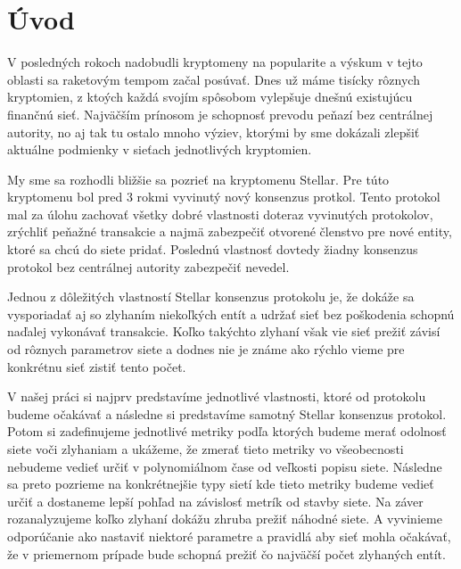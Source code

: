 \chapter*{Úvod} %

V posledných rokoch nadobudli kryptomeny na popularite a výskum v tejto
oblasti sa raketovým tempom začal posúvať. Dnes už máme tisícky rôznych
kryptomien, z ktoých každá svojím spôsobom vylepšuje dnešnú existujúcu
finančnú sieť. Najväčším prínosom je schopnosť prevodu peňazí bez
centrálnej autority, no aj tak tu ostalo mnoho výziev, ktorými by sme
dokázali zlepšiť aktuálne podmienky v sieťach jednotlivých kryptomien.

My sme sa rozhodli bližšie sa pozrieť na kryptomenu Stellar. Pre túto
kryptomenu bol pred 3 rokmi vyvinutý nový konsenzus protkol. Tento
protokol mal za úlohu zachovať všetky dobré vlastnosti doteraz vyvinutých
protokolov, zrýchliť peňažné transakcie a najmä zabezpečiť otvorené
členstvo pre nové entity, ktoré sa chcú do siete pridať. Poslednú vlastnosť
dovtedy žiadny konsenzus protokol bez centrálnej autority zabezpečiť nevedel.

Jednou z dôležitých vlastností Stellar konsenzus protokolu je, že dokáže sa
vysporiadať aj so zlyhaním niekoľkých entít a udržať sieť bez poškodenia
schopnú naďalej vykonávať transakcie.
Koľko takýchto zlyhaní však vie sieť prežiť závisí od rôznych parametrov siete
a dodnes nie je známe ako rýchlo vieme pre konkrétnu sieť zistiť tento počet.

V našej práci si najprv predstavíme jednotlivé vlastnosti, ktoré od protokolu
budeme očakávať a následne si predstavíme samotný Stellar konsenzus protokol.
Potom si zadefinujeme jednotlivé metriky podľa ktorých budeme merať odolnosť
siete voči zlyhaniam a ukážeme, že zmerať tieto metriky vo všeobecnosti
nebudeme vedieť určiť v polynomiálnom čase od veľkosti popisu siete.
Následne sa preto pozrieme na konkrétnejšie typy sietí kde tieto metriky
budeme vedieť určiť a dostaneme lepší pohľad na závislosť metrík od stavby siete.
Na záver rozanalyzujeme koľko zlyhaní dokážu zhruba prežiť náhodné siete.
A vyvinieme odporúčanie ako nastaviť niektoré parametre a pravidlá aby
sieť mohla očakávať, že v priemernom prípade bude schopná prežiť čo najväčší
počet zlyhaných entít.
